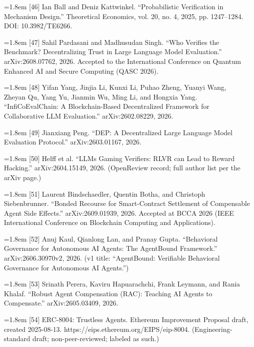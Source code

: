 \documentclass[11pt]{article}
\begin{document}
\noindent\hangindent=1.8em [46] Ian Ball and Deniz Kattwinkel. ``Probabilistic Verification in Mechanism Design.'' Theoretical Economics, vol. 20, no. 4, 2025, pp. 1247–1284. DOI: 10.3982/TE6266.\par\medskip
\noindent\hangindent=1.8em [47] Sahil Pardasani and Madhusudan Singh. ``Who Verifies the Benchmark? Decentralizing Trust in Large Language Model Evaluation.'' arXiv:2608.07762, 2026. Accepted to the International Conference on Quantum Enhanced AI and Secure Computing (QASC 2026).\par\medskip
\noindent\hangindent=1.8em [48] Yifan Yang, Jinjia Li, Kunxi Li, Puhao Zheng, Yuanyi Wang, Zheyan Qu, Yang Yu, Jianmin Wu, Ming Li, and Hongxia Yang. ``InfiCoEvalChain: A Blockchain-Based Decentralized Framework for Collaborative LLM Evaluation.'' arXiv:2602.08229, 2026.\par\medskip
\noindent\hangindent=1.8em [49] Jianxiang Peng. ``DEP: A Decentralized Large Language Model Evaluation Protocol.'' arXiv:2603.01167, 2026.\par\medskip
\noindent\hangindent=1.8em [50] Helff et al. ``LLMs Gaming Verifiers: RLVR can Lead to Reward Hacking.'' arXiv:2604.15149, 2026. (OpenReview record; full author list per the arXiv page.)\par\medskip
\noindent\hangindent=1.8em [51] Laurent Bindschaedler, Quentin Botha, and Christoph Siebenbrunner. ``Bonded Recourse for Smart-Contract Settlement of Compensable Agent Side Effects.'' arXiv:2609.01939, 2026. Accepted at BCCA 2026 (IEEE International Conference on Blockchain Computing and Applications).\par\medskip
\noindent\hangindent=1.8em [52] Anuj Kaul, Qianlong Lan, and Pranay Gupta. ``Behavioral Governance for Autonomous AI Agents: The AgentBound Framework.'' arXiv:2606.30970v2, 2026. (v1 title: ``AgentBound: Verifiable Behavioral Governance for Autonomous AI Agents.'')\par\medskip
\noindent\hangindent=1.8em [53] Srinath Perera, Kaviru Hapuarachchi, Frank Leymann, and Rania Khalaf. ``Robust Agent Compensation (RAC): Teaching AI Agents to Compensate.'' arXiv:2605.03409, 2026.\par\medskip
\noindent\hangindent=1.8em [54] ERC-8004: Trustless Agents. Ethereum Improvement Proposal draft, created 2025-08-13. https://eips.ethereum.org/EIPS/eip-8004. (Engineering-standard draft; non-peer-reviewed; labeled as such.)\par\medskip
\end{document}
